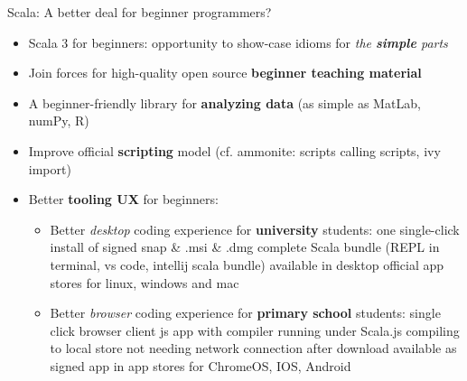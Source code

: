 \documentclass[aspectratio=169]{beamer}
\newenvironment{Slide}[1]%
  {\begin{frame}[environment=Slide]{#1}}
  {\end{frame}}%
\begin{document}
\begin{Slide}{Scala: A better deal for beginner programmers?}
  \begin{itemize}
    \item Scala 3 for beginners: opportunity to show-case idioms for \textit{the \textbf{simple} parts}
    \item Join forces for high-quality open source \textbf{beginner teaching material}
    \item A beginner-friendly library for \textbf{analyzing data} (as simple as MatLab, numPy, R)
    \item Improve official \textbf{scripting} model (cf. ammonite: scripts calling scripts, ivy import)
    \item Better \textbf{tooling UX} for beginners: 
    \begin{itemize}
      \item Better \textit{desktop} coding experience for \textbf{university} students: one single-click install of signed snap \& .msi \& .dmg  complete Scala bundle (REPL in terminal, vs code, intellij scala bundle) available in desktop official app stores for linux, windows and mac
      \item Better \textit{browser} coding experience for \textbf{primary school} students: single click browser client js app with compiler running under Scala.js compiling to local store not needing network connection after download available as signed app in app stores for ChromeOS, IOS, Android
    \end{itemize}
  \end{itemize}

\end{Slide}


\begin{frame}[plain]
  \begin{figure}
  \centering
  \end{figure}%


\end{frame}%
\end{document}
